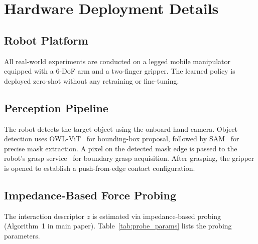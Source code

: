 \section{Hardware Deployment Details}\label{app:hardware}

\subsection{Robot Platform}

All real-world experiments are conducted on a legged mobile manipulator equipped with a 6-DoF arm and a two-finger gripper.
The learned policy is deployed zero-shot without any retraining or fine-tuning.

\subsection{Perception Pipeline}

The robot detects the target object using the onboard hand camera.
Object detection uses OWL-ViT~\cite{minderer2022simple} for bounding-box proposal, followed by SAM~\cite{kirillov2023segment} for precise mask extraction.
A pixel on the detected mask edge is passed to the robot's grasp service~\cite{spotsdk} for boundary grasp acquisition.
After grasping, the gripper is opened to establish a push-from-edge contact configuration.

\subsection{Impedance-Based Force Probing}

The interaction descriptor $z$ is estimated via impedance-based probing (Algorithm~1 in main paper).
Table~\ref{tab:probe_params} lists the probing parameters.

